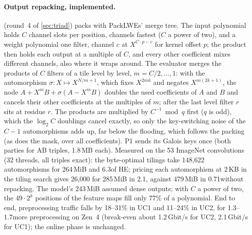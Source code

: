 \paragraph{Output repacking, implemented.}  (round~4 of \cref{sec:triad}) packs with
PackLWEs' merge tree. The input polynomial holds $C$ channel slots per position, channels fastest ($C$ a power of
two), and a weight polynomial one filter, channel $c$ at $X^{C \cdot p - c}$ for kernel offset $p$; the product then
holds each output at a multiple of $C$, and every other coefficient mixes different channels, also where it wraps
around. The evaluator merges the products of $C$ filters of a tile level by level, $m = C/2, \dots, 1$: with the
automorphism $\sigma: X \mapsto X^{N/m + 1}$, which fixes $X^{2mk}$ and negates $X^{m(2k+1)}$, the node
$A + X^m B + \sigma(A - X^m B)$ doubles the used coefficients of $A$ and $B$ and cancels their other coefficients at
the multiples of $m$; after the last level filter $r$ sits at residue $r$. The products are multiplied by
$C^{-1} \bmod q$ first ($q$ is odd), which the $\log_2 C$ doublings cancel exactly, so only the key-switching noise of
the $C - 1$ automorphisms adds up, far below the flooding, which follows the packing (as does the mask, over all
coefficients). P1 sends its Galois keys once (both parties for AB triples, 1.8\,MB each). Measured on the 53
ImageNet convolutions (32 threads, all triples exact): the byte-optimal tilings take 148{,}622 automorphisms for
264\,MiB and 6.3\s of HE; pricing each automorphism at 2\,KB in the tiling search gives 26{,}000 for 285\,MiB in 2.1\s,
against 479\,MiB in 0.71\s without repacking. The model's 243\,MiB assumed dense outputs; with $C$ a power of two,
the $49 \cdot 2^k$ positions of the feature maps fill only 77\% of a polynomial. End to end, preprocessing traffic
falls by 18--31\% in UC1 and 11--24\% in UC2, for 1.3--1.7\s more preprocessing on Zen~4 (break-even about
1.2\,Gbit/s for UC2, 2.1\,Gbit/s for UC1); the online phase is unchanged.

